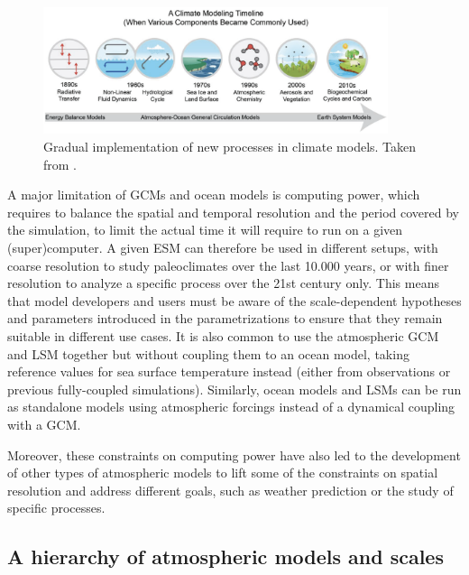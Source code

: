 \begin{figure}[hbtp]
    \centering
    \includegraphics[width=0.9\textwidth]{images/intro/climate_modelling_evolution_kotamarthi.png}
    \caption{Gradual implementation of new processes in climate models. Taken from \citep{kotamarthi_downscaling_2021}. 
    }
    \label{fig:GCM_processes}
\end{figure}

A major limitation of GCMs and ocean models is computing power, which requires to balance the spatial and temporal resolution and the period covered by the simulation, to limit the actual time it will require to run on a given (super)computer. A given ESM can therefore be used in different setups, with coarse resolution to study paleoclimates over the last 10.000 years, or with finer resolution to analyze a specific process over the 21st century only. This means that model developers and users must be aware of the scale-dependent hypotheses and parameters introduced in the parametrizations to ensure that they remain suitable in different use cases.
It is also common to use the atmospheric GCM and LSM together but without coupling them to an ocean model, taking reference values for sea surface temperature instead (either from observations or previous fully-coupled simulations). Similarly, ocean models and LSMs can be run as standalone models using atmospheric forcings instead of a dynamical coupling with a GCM. 

Moreover, these constraints on computing power have also led to the development of other types of atmospheric models to lift some of the constraints on spatial resolution and address different goals, such as weather prediction or the study of specific processes. 

\subsection{A hierarchy of atmospheric models and scales}

